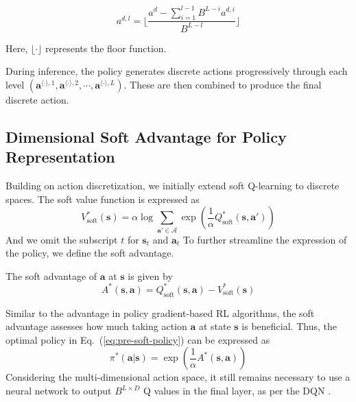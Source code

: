 \begin{equation}
    a^{d, l} = \lfloor \frac{a^{d} - \sum_{i=1}^{l-1} B^{L-i} a^{d, i}}{B^{L-l}} \rfloor
\end{equation}

Here, $\lfloor \cdot \rfloor$ represents the floor function.

During inference, the policy generates discrete actions progressively through each level $(\mathbf{a}^{\langle \cdot \rangle, 1}, \mathbf{a}^{\langle \cdot \rangle, 2}, \cdots, \mathbf{a}^{\langle \cdot \rangle, L})$. 
These are then combined to produce the final discrete action.

\subsection{Dimensional Soft Advantage for Policy Representation}
\label{sec:med-dsa}

Building on action discretization, we initially extend soft Q-learning to discrete spaces. 
The soft value function is expressed as
\begin{equation}
    V^*_{\text{soft}}(\mathbf{s}) = \alpha \log \sum_{\mathbf{a}' \in \mathcal{A}} \exp \left( \frac{1}{\alpha} Q^*_{\text{soft}}(\mathbf{s}, \mathbf{a}') \right)
\end{equation}
And we omit the subscript $t$ for $\mathbf{s}_t$ and $\mathbf{a}_t$
To further streamline the expression of the policy, we define the soft advantage.

\begin{definition}
    The soft advantage of $\mathbf{a}$ at $\mathbf{s}$ is given by
    \begin{equation}
        A^*(\mathbf{s}, \mathbf{a}) = Q^*_{\text{soft}}(\mathbf{s}, \mathbf{a}) - V^*_{\text{soft}}(\mathbf{s})
    \end{equation}
\end{definition}

Similar to the advantage in policy gradient-based RL algorithms, the soft advantage assesses how much taking action $\mathbf{a}$ at state $\mathbf{s}$ is beneficial. 
Thus, the optimal policy in Eq.~(\ref{eq:pre-soft-policy}) can be expressed as
\begin{equation}
\label{eq:med-sa-pi}
    \pi^*(\mathbf{a} | \mathbf{s}) = \exp \left( \frac{1}{\alpha} A^*(\mathbf{s}, \mathbf{a}) \right)
\end{equation}
Considering the multi-dimensional action space, it still remains necessary to use a neural network to output $B^{L \times D}$ Q values in the final layer, as per the DQN \cite{NatureDQN}.


